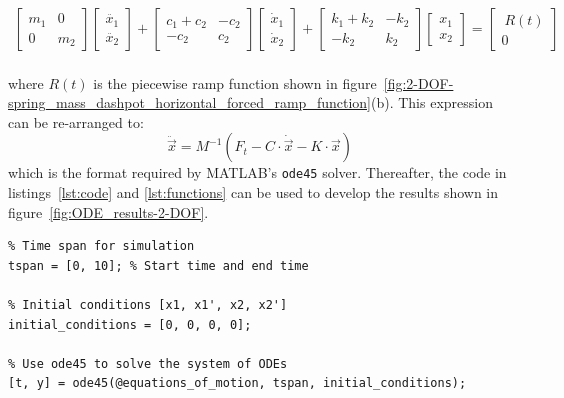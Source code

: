 \documentclass[12pt,letter]{article}
\begin{document}
\begin{example}
				\begin{eqnarray}
				  \begin{bmatrix} m_1 & 0  \\  0 & m_2 \end{bmatrix}\begin{bmatrix} \ddot{x_1} \\  \ddot{x_2} \end{bmatrix} + \begin{bmatrix} c_1+c_2 & -c_2  \\  -c_2 & c_2 \end{bmatrix}\begin{bmatrix} \dot{x}_1 \\  \dot{x}_2 \end{bmatrix} + \begin{bmatrix} k_1+k_2 & -k_2  \\  -k_2 & k_2 \end{bmatrix}\begin{bmatrix} x_1 \\  x_2 \end{bmatrix}  = \begin{bmatrix} \ R(t) \\  0 \end{bmatrix}
				\end{eqnarray} \\
where $R(t)$ is the piecewise ramp function shown in figure~\ref{fig:2-DOF-spring_mass_dashpot_horizontal_forced_ramp_function}(b). This expression can be re-arranged to:				
\begin{equation}
\ddot{\vec{x}} = M^{-1}(F_t - C \cdot \dot{\vec{x}} -K \cdot \vec{x})
\end{equation}
which is the format required by MATLAB's \texttt{ode45} solver. Thereafter, the code in listings~\ref{lst:code} and \ref{lst:functions} can be used to develop the results shown in figure~\ref{fig:ODE_results-2-DOF}. 


			


	

\begin{lstlisting}
% Time span for simulation
tspan = [0, 10]; % Start time and end time

% Initial conditions [x1, x1', x2, x2']
initial_conditions = [0, 0, 0, 0];

% Use ode45 to solve the system of ODEs
[t, y] = ode45(@equations_of_motion, tspan, initial_conditions);


\end{lstlisting}
\end{example}
\end{document}

